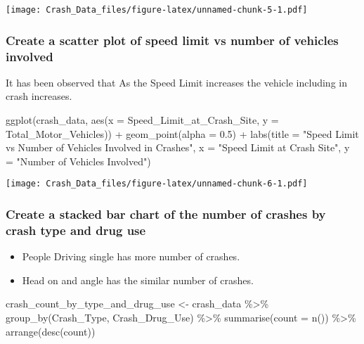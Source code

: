 \documentclass[
]{article}
\newenvironment{Shaded}{\begin{snugshade}}{\end{snugshade}}
\newcommand{\AttributeTok}[1]{\textcolor[rgb]{0.77,0.63,0.00}{#1}}
\newcommand{\FloatTok}[1]{\textcolor[rgb]{0.00,0.00,0.81}{#1}}
\newcommand{\FunctionTok}[1]{\textcolor[rgb]{0.00,0.00,0.00}{#1}}
\newcommand{\NormalTok}[1]{#1}
\newcommand{\OtherTok}[1]{\textcolor[rgb]{0.56,0.35,0.01}{#1}}
\newcommand{\SpecialCharTok}[1]{\textcolor[rgb]{0.00,0.00,0.00}{#1}}
\newcommand{\StringTok}[1]{\textcolor[rgb]{0.31,0.60,0.02}{#1}}
\providecommand{\tightlist}{%
  \setlength{\itemsep}{0pt}\setlength{\parskip}{0pt}}
\begin{document}
\texttt{[image: Crash\_Data\_files/figure-latex/unnamed-chunk-5-1.pdf]}

\hypertarget{create-a-scatter-plot-of-speed-limit-vs-number-of-vehicles-involved}{%
\subsubsection{Create a scatter plot of speed limit vs number of
vehicles
involved}\label{create-a-scatter-plot-of-speed-limit-vs-number-of-vehicles-involved}}

It has been observed that As the Speed Limit increases the vehicle
including in crash increases.

\begin{Shaded}
\begin{Highlighting}[]
\FunctionTok{ggplot}\NormalTok{(crash\_data, }\FunctionTok{aes}\NormalTok{(}\AttributeTok{x =}\NormalTok{ Speed\_Limit\_at\_Crash\_Site, }\AttributeTok{y =}\NormalTok{ Total\_Motor\_Vehicles)) }\SpecialCharTok{+}
  \FunctionTok{geom\_point}\NormalTok{(}\AttributeTok{alpha =} \FloatTok{0.5}\NormalTok{) }\SpecialCharTok{+}
  \FunctionTok{labs}\NormalTok{(}\AttributeTok{title =} \StringTok{"Speed Limit vs Number of Vehicles Involved in Crashes"}\NormalTok{, }\AttributeTok{x =} \StringTok{"Speed Limit at Crash Site"}\NormalTok{, }\AttributeTok{y =} \StringTok{"Number of Vehicles Involved"}\NormalTok{)}
\end{Highlighting}
\end{Shaded}

\texttt{[image: Crash\_Data\_files/figure-latex/unnamed-chunk-6-1.pdf]}

\hypertarget{create-a-stacked-bar-chart-of-the-number-of-crashes-by-crash-type-and-drug-use}{%
\subsubsection{Create a stacked bar chart of the number of crashes by
crash type and drug
use}\label{create-a-stacked-bar-chart-of-the-number-of-crashes-by-crash-type-and-drug-use}}

\begin{itemize}
\tightlist
\item
  People Driving single has more number of crashes.
\item
  Head on and angle has the similar number of crashes.
\end{itemize}

\begin{Shaded}
\begin{Highlighting}[]
\NormalTok{crash\_count\_by\_type\_and\_drug\_use }\OtherTok{\textless{}{-}}\NormalTok{ crash\_data }\SpecialCharTok{\%\textgreater{}\%}
  \FunctionTok{group\_by}\NormalTok{(Crash\_Type, Crash\_Drug\_Use) }\SpecialCharTok{\%\textgreater{}\%}
  \FunctionTok{summarise}\NormalTok{(}\AttributeTok{count =} \FunctionTok{n}\NormalTok{()) }\SpecialCharTok{\%\textgreater{}\%}
  \FunctionTok{arrange}\NormalTok{(}\FunctionTok{desc}\NormalTok{(count))}
\end{Highlighting}
\end{Shaded}
\end{document}
